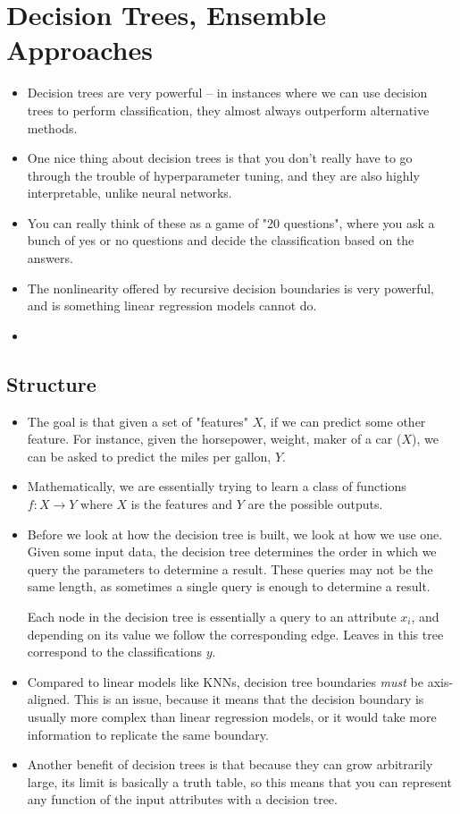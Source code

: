 \section{Decision Trees, Ensemble Approaches}
\begin{itemize}
	\item Decision trees are very powerful -- in instances where we can use decision trees to perform
		classification, they almost always outperform alternative methods.  
	\item One nice thing about decision trees is that you don't really have to go through the trouble of
		hyperparameter tuning, and they are also highly interpretable, unlike neural networks.   
	\item You can really think of these as a game of "20 questions", where you ask a bunch of yes or no
		questions and decide the classification based on the answers.   
	\item The nonlinearity offered by recursive decision boundaries is very powerful, and is something linear
		regression models cannot do.
	\item {}
\end{itemize}

\subsection{Structure}
\begin{itemize}
	\item The goal is that given a set of "features" \( X \), if we can predict some other feature. For
		instance, given the horsepower, weight, maker of a car (\( X \)), we can be asked to predict the miles per
		gallon, \( Y \).
	\item Mathematically, we are essentially trying to learn a class of functions \( f: X \to Y \) where \( X
		\) is the features and \( Y \) are the possible outputs.    
	\item Before we look at how the decision tree is built, we look at how we use one. Given some input data,
		the decision tree determines the order in which we query the parameters to determine a result. These
		queries may not be the same length, as sometimes a single query is enough to determine a result.    

		Each node in the decision tree is essentially a query to an attribute \( x_i \), and depending on its
		value we follow the corresponding edge. Leaves in this tree correspond to the classifications \( y
		\).  
	\item Compared to linear models like KNNs, decision tree boundaries \textit{must} be axis-aligned. This
		is an issue, because it means that the decision boundary is usually more complex than linear
		regression models, or it would take more information to replicate the same boundary.  
	\item Another benefit of decision trees is that because they can grow arbitrarily large, its limit is
		basically a truth table, so this means that you can represent any function of the input attributes
		with a decision tree.     
\end{itemize}

